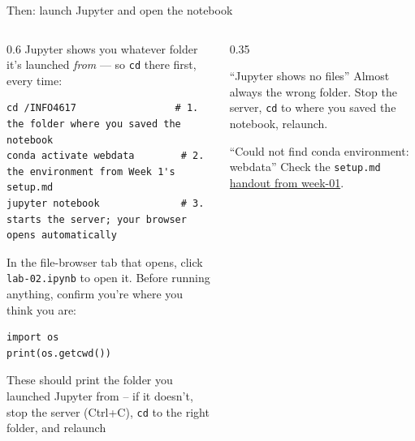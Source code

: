 \documentclass[9pt,aspectratio=169]{beamer}
\begin{document}
\begin{frame}[fragile]{Then: launch Jupyter and open the notebook}
    \begin{columns}[T]
        \begin{column}{0.6\textwidth}
            Jupyter shows you whatever folder it's launched \textit{from} --- so \texttt{cd} there first, every time:
            
\begin{lstlisting}
cd /INFO4617                 # 1. the folder where you saved the notebook
conda activate webdata        # 2. the environment from Week 1's setup.md
jupyter notebook              # 3. starts the server; your browser opens automatically
\end{lstlisting}

\medskip

                In the file-browser tab that opens, click \texttt{lab-02.ipynb} to open it. Before running anything, confirm you're where you think you are:
\begin{lstlisting}
import os
print(os.getcwd())
\end{lstlisting}

\medskip

            These should print the folder you launched Jupyter from -- if it doesn't, stop the server (Ctrl+C), \texttt{cd} to the right folder, and relaunch
        \end{column}
        
        \begin{column}{0.35\textwidth}
            \begin{alertblock}{``Jupyter shows no files''}
                \footnotesize Almost always the wrong folder. Stop the server, \texttt{cd} to where you saved the notebook, relaunch.
            \end{alertblock}

            \begin{alertblock}{``Could not find conda environment: webdata''}
                \footnotesize Check the \texttt{setup.md} \href{https://github.com/cuinfoscience/INFO4617-Fall2026/blob/main/handouts/week-01/setup.md}{handout from week-01}.
            \end{alertblock}
        \end{column}
    \end{columns}
\end{frame}

\end{document}

